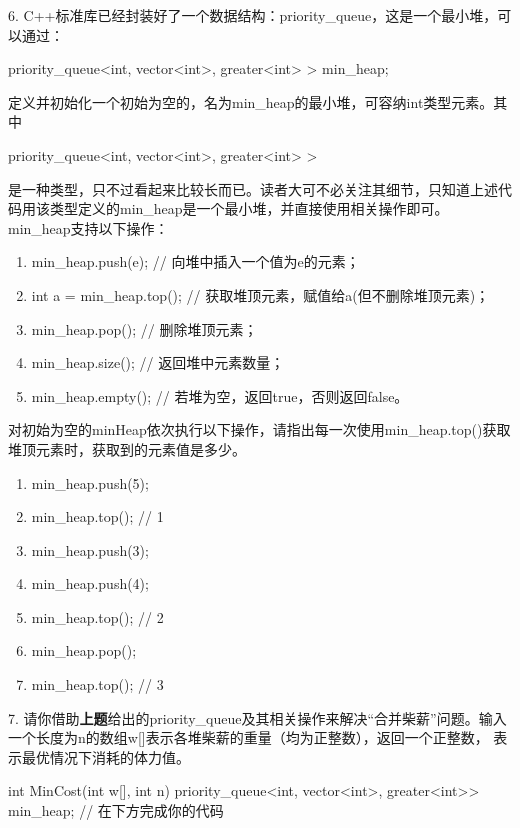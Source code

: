 \begin{exercise}
    6. C++标准库已经封装好了一个数据结构：priority\_queue，这是一个最小堆，可以通过：
    \begin{bulk}
        priority\_queue<int, vector<int>, greater<int> > min\_heap;            
    \end{bulk}
    定义并初始化一个初始为空的，名为min\_heap的最小堆，可容纳int类型元素。其中
    \begin{bulk}
        priority\_queue<int, vector<int>, greater<int> >
    \end{bulk}
    是一种类型，只不过看起来比较长而已。读者大可不必关注其细节，只知道上述代码用该类型定义的min\_heap是一个最小堆，并直接使用相关操作即可。
    min\_heap支持以下操作：
    \begin{enumerate}[label=\arabic*）]
        \item min\_heap.push(e);  // 向堆中插入一个值为e的元素；
        \item int a = min\_heap.top();   // 获取堆顶元素，赋值给a(但不删除堆顶元素)；
        \item min\_heap.pop();       // 删除堆顶元素；
        \item min\_heap.size();      // 返回堆中元素数量；
        \item min\_heap.empty();     // 若堆为空，返回true，否则返回false。
    \end{enumerate}
    对初始为空的minHeap依次执行以下操作，请指出每一次使用min\_heap.top()获取堆顶元素时，获取到的元素值是多少。
    \begin{enumerate}[label=\arabic*）]
        \item min\_heap.push(5);  
        \item min\_heap.top();    // 1
        \item min\_heap.push(3);
        \item min\_heap.push(4);  
        \item min\_heap.top();    // 2
        \item min\_heap.pop();    
        \item min\_heap.top();    // 3
    \end{enumerate}

    \vspace{\baselineskip}

    7. 请你借助{\color{red}\textbf{上题}}给出的priority\_queue及其相关操作来解决“合并柴薪”问题。输入一个长度为n的数组w[]表示各堆柴薪的重量（均为正整数），返回一个正整数，
    表示最优情况下消耗的体力值。
    \begin{cppcode}
        int MinCost(int w[], int n) {
            priority_queue<int, vector<int>, greater<int>> min_heap;      
            // 在下方完成你的代码
        }
    \end{cppcode}


\end{exercise}
